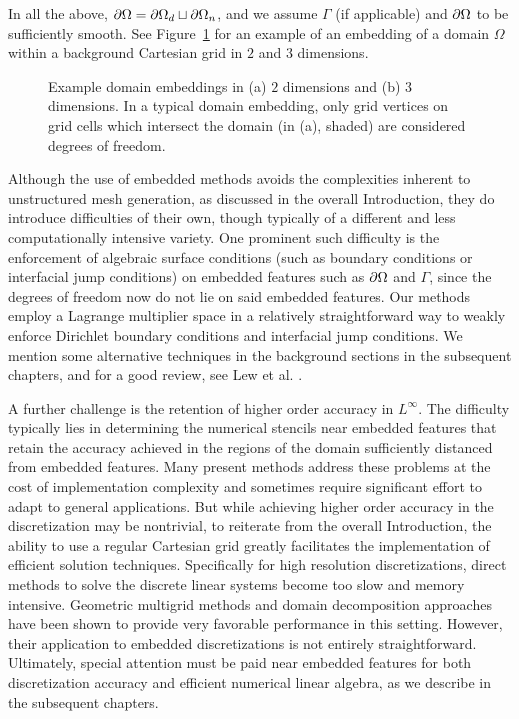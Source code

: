 In all the above, $\partial\Omega = \partial\Omega_d \sqcup \partial\Omega_n$, and we assume $\Gamma$ (if applicable) and $\partial\Omega$ to be sufficiently smooth. See Figure~\ref{fig:partII.embedding} for an example of an embedding of a domain $\Omega$ within a background Cartesian grid in $2$ and $3$ dimensions.

\setlength{\figureheight}{0.50\textwidth}
\begin{figure}[htb]
\centering
{}
\caption{Example domain embeddings in (a) $2$ dimensions and (b) $3$ dimensions. In a typical domain embedding, only grid vertices on grid cells which intersect the domain (in (a), shaded) are considered degrees of freedom.}
\label{fig:partII.embedding}
\end{figure}

Although the use of embedded methods avoids the complexities inherent to unstructured mesh generation, as discussed in the overall Introduction, they do introduce difficulties of their own, though typically of a different and less computationally intensive variety. One prominent such difficulty is the enforcement of algebraic surface conditions (such as boundary conditions or interfacial jump conditions) on embedded features such as $\partial\Omega$ and $\Gamma$, since the degrees of freedom now do not lie on said embedded features. Our methods employ a Lagrange multiplier space in a relatively straightforward way to weakly enforce Dirichlet boundary conditions and interfacial jump conditions. We mention some alternative techniques in the background sections in the subsequent chapters, and for a good review, see Lew et al. \cite{Lew.Adrian08}.

A further challenge is the retention of higher order accuracy in $L^{\infty}$. The difficulty typically lies in determining the numerical stencils near embedded features that retain the accuracy achieved in the regions of the domain sufficiently distanced from embedded features. Many present methods address these problems at the cost of implementation complexity and sometimes require significant effort to adapt to general applications. But while achieving higher order accuracy in the discretization may be nontrivial, to reiterate from the overall Introduction, the ability to use a regular Cartesian grid greatly facilitates the implementation of efficient solution techniques. Specifically for high resolution discretizations, direct methods to solve the discrete linear systems become too slow and memory intensive. Geometric multigrid methods and domain decomposition approaches have been shown to provide very favorable performance in this setting. However, their application to embedded discretizations is not entirely straightforward. Ultimately, special attention must be paid near embedded features for both discretization accuracy and efficient numerical linear algebra, as we describe in the subsequent chapters.

